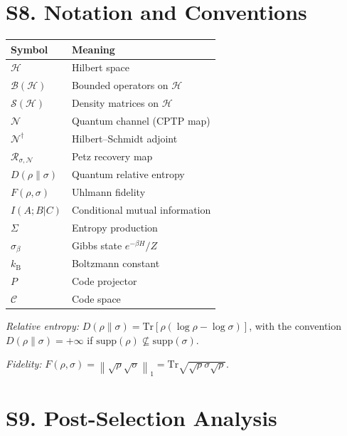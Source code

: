 \documentclass[prl,twocolumn,superscriptaddress,longbibliography]{revtex4-2}
\newcommand{\kB}{k_{\mathrm{B}}}
\newcommand{\Tr}{\mathrm{Tr}}
\newcommand{\Petz}{\mathcal{R}}
\newcommand{\chan}{\mathcal{N}}
\newcommand{\hilb}{\mathcal{H}}
\newcommand{\code}{\mathcal{C}}
\newcommand{\norm}[1]{\left\|#1\right\|}
\begin{document}
\section{S8. Notation and Conventions}
\label{sec:notation}

\begin{center}
\begin{tabular}{ll}
\toprule
\textbf{Symbol} & \textbf{Meaning} \\
\midrule
$\hilb$ & Hilbert space \\
$\mathcal{B}(\hilb)$ & Bounded operators on $\hilb$ \\
$\mathcal{S}(\hilb)$ & Density matrices on $\hilb$ \\
$\chan$ & Quantum channel (CPTP map) \\
$\chan^\dagger$ & Hilbert--Schmidt adjoint \\
$\Petz_{\sigma,\chan}$ & Petz recovery map \\
$D(\rho\|\sigma)$ & Quantum relative entropy \\
$F(\rho,\sigma)$ & Uhlmann fidelity \\
$I(A;B|C)$ & Conditional mutual information \\
$\Sigma$ & Entropy production \\
$\sigma_\beta$ & Gibbs state $e^{-\beta H}/Z$ \\
$\kB$ & Boltzmann constant \\
$P$ & Code projector \\
$\code$ & Code space \\
\bottomrule
\end{tabular}
\end{center}

\emph{Relative entropy:} $D(\rho\|\sigma) = \Tr[\rho(\log\rho -
\log\sigma)]$, with the convention $D(\rho\|\sigma) = +\infty$ if
$\mathrm{supp}(\rho) \not\subseteq \mathrm{supp}(\sigma)$.

\emph{Fidelity:} $F(\rho,\sigma) = \norm{\sqrt{\rho}\sqrt{\sigma}}_1
= \Tr\sqrt{\sqrt{\rho}\sigma\sqrt{\rho}}$.

\section{S9. Post-Selection Analysis}
\label{sec:postselection}
\end{document}
